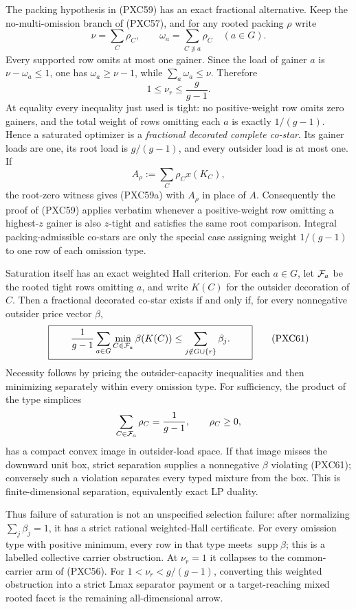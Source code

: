 \documentclass[11pt]{article}
\begin{document}
The packing hypothesis in (PXC59) has an exact fractional alternative.  Keep
the no-multi-omission branch of (PXC57), and for any rooted packing $\rho$
write
\[
 \nu=\sum_C\rho_C,\qquad
 \omega_a=\sum_{C\not\ni a}\rho_C\quad(a\in G).
\]
Every supported row omits at most one gainer.  Since the load of gainer $a$
is $\nu-\omega_a\le1$, one has $\omega_a\ge\nu-1$, while
$\sum_a\omega_a\le\nu$.  Therefore
\[
 \boxed{\qquad 1\le\nu_r\le\frac g{g-1}.\qquad}     \tag{PXC60}
\]
At equality every inequality just used is tight: no positive-weight row
omits zero gainers, and the total weight of rows omitting each $a$ is exactly
$1/(g-1)$.  Hence a saturated optimizer is a \emph{fractional decorated
complete co-star}.  Its gainer loads are one, its root load is $g/(g-1)$,
and every outsider load is at most one.  If
\[
 A_\rho:=\sum_C\rho_C x(K_C),
\]
the root-zero witness gives (PXC59a) with $A_\rho$ in place of $A$.
Consequently the proof of (PXC59) applies verbatim whenever a positive-weight
row omitting a highest-$z$ gainer is also $z$-tight and satisfies the same
root comparison.  Integral packing-admissible co-stars are only the special
case assigning weight $1/(g-1)$ to one row of each omission type.

Saturation itself has an exact weighted Hall criterion.  For each $a\in G$,
let ${\cal F}_a$ be the rooted tight rows omitting $a$, and write $K(C)$ for
the outsider decoration of $C$.  Then a fractional decorated co-star exists
if and only if, for every nonnegative outsider price vector $\beta$,
\[
 \boxed{\qquad
 \frac1{g-1}\sum_{a\in G}\min_{C\in{\cal F}_a}\beta(K(C))
 \le\sum_{j\notin G\cup\{r\}}\beta_j .
 \qquad}                                             \tag{PXC61}
\]
Necessity follows by pricing the outsider-capacity inequalities and then
minimizing separately within every omission type.  For sufficiency, the
product of the type simplices
\[
 \sum_{C\in{\cal F}_a}\rho_C=\frac1{g-1},\qquad \rho_C\ge0,
\]
has a compact convex image in outsider-load space.  If that image misses the
downward unit box, strict separation supplies a nonnegative $\beta$ violating
(PXC61); conversely such a violation separates every typed mixture from the
box.  This is finite-dimensional separation, equivalently exact LP duality.

Thus failure of saturation is not an unspecified selection failure: after
normalizing $\sum_j\beta_j=1$, it has a strict rational weighted-Hall
certificate.  For every omission type with positive minimum, every row in
that type meets $\operatorname{supp}\beta$; this is a labelled collective
carrier obstruction.  At $\nu_r=1$ it collapses to the common-carrier arm of
(PXC56).  For $1<\nu_r<g/(g-1)$, converting this weighted obstruction into a
strict Lmax separator payment or a target-reaching mixed rooted facet is the
remaining all-dimensional arrow.
\end{document}
